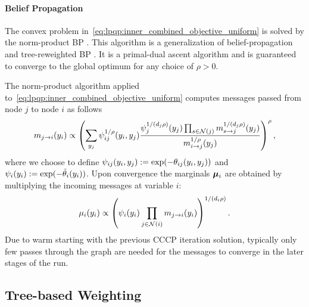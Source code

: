 \paragraph{Belief Propagation} 
The convex problem in~\eqref{eq:lpqp:inner_combined_objective_uniform} is 
solved by the norm-product \acf{BP}
\parencite{Hazan2010a}.
This algorithm is a generalization of 
belief-propagation \parencite{Yedidia2005} and tree-reweighted \ac{BP} \parencite{Wainwright2005}. 
It is a primal-dual ascent algorithm and is guaranteed to converge to the global optimum 
for any choice of $\rho > 0$.

The norm-product algorithm applied to~\eqref{eq:lpqp:inner_combined_objective_uniform}
computes messages passed from node $j$ to node $i$ as follows
\[
 m_{j\to i}(y_i) \propto
  \left( \sum_{y_j}
    \psi_{ij}^{1/\rho}(y_i,y_j)
    \frac{\psi_j^{1/(d_j\rho)}(y_j)\prod_{s\in\mathcal{N}(j)}m_{s\to
    j}^{1/(d_j \rho)}(y_j)}{m_{i\to
    j}^{1/\rho}(y_j)} \right)^{\rho},
\]
where we choose to define $\psi_{ij}(y_i,y_j) :=
\exp(-\theta_{ij}(y_i,y_j))$ and $\psi_{i}(y_i) :=
\exp(-\tilde{\theta}_i(y_i))$.
Upon convergence the marginals $\bm{\mu}_i$ are obtained by multiplying the incoming
messages at variable $i$:
\[
    \mu_i(y_i) \propto \left( \psi_i(y_i) 
    \prod_{j\in\mathcal{N}(i)} m_{j\to i} (y_i) \right
    )^{1/(d_i \rho)}.
\]
Due to warm starting with the previous \ac{CCCP} iteration solution, 
typically only few passes through the graph are needed for the 
messages to converge in the later stages of the run.

\subsection{Tree-based Weighting}
\label{sec:lpqp:sdd}

